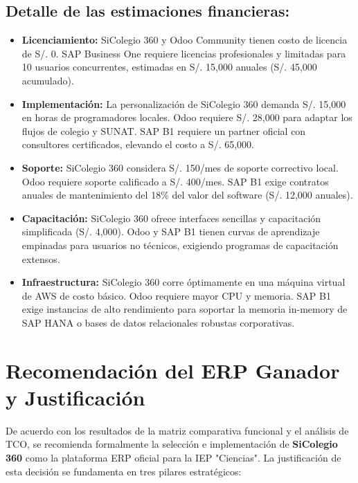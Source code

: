 \documentclass[12pt,a4paper,oneside]{report}
\begin{document}
\subsection{Detalle de las estimaciones financieras:}
\begin{itemize}
    \item \textbf{Licenciamiento:} SiColegio 360 y Odoo Community tienen costo de licencia de S/. 0. SAP Business One requiere licencias profesionales y limitadas para 10 usuarios concurrentes, estimadas en S/. 15,000 anuales (S/. 45,000 acumulado).
    \item \textbf{Implementación:} La personalización de SiColegio 360 demanda S/. 15,000 en horas de programadores locales. Odoo requiere S/. 28,000 para adaptar los flujos de colegio y SUNAT. SAP B1 requiere un partner oficial con consultores certificados, elevando el costo a S/. 65,000.
    \item \textbf{Soporte:} SiColegio 360 considera S/. 150/mes de soporte correctivo local. Odoo requiere soporte calificado a S/. 400/mes. SAP B1 exige contratos anuales de mantenimiento del 18\% del valor del software (S/. 12,000 anuales).
    \item \textbf{Capacitación:} SiColegio 360 ofrece interfaces sencillas y capacitación simplificada (S/. 4,000). Odoo y SAP B1 tienen curvas de aprendizaje empinadas para usuarios no técnicos, exigiendo programas de capacitación extensos.
    \item \textbf{Infraestructura:} SiColegio 360 corre óptimamente en una máquina virtual de AWS de costo básico. Odoo requiere mayor CPU y memoria. SAP B1 exige instancias de alto rendimiento para soportar la memoria in-memory de SAP HANA o bases de datos relacionales robustas corporativas.
\end{itemize}

\newpage

\section{Recomendación del ERP Ganador y Justificación}

De acuerdo con los resultados de la matriz comparativa funcional y el análisis de TCO, se recomienda formalmente la selección e implementación de \textbf{SiColegio 360} como la plataforma ERP oficial para la IEP "Ciencias". La justificación de esta decisión se fundamenta en tres pilares estratégicos:
\end{document}
